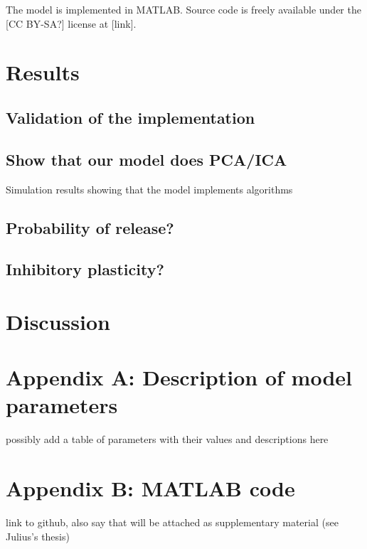 \documentclass[a4paper,12pt]{report}
\theoremstyle{definition}
\begin{document}
The model is implemented in MATLAB. Source code is freely available under the [CC BY-SA?] license at [link].


\chapter{Results}
\section{Validation of the implementation}

\section{Show that our model does PCA/ICA}
Simulation results showing that the model implements algorithms

\section{Probability of release?}

\section{Inhibitory plasticity?}


\chapter{Discussion}



\chapter*{Appendix A: Description of model parameters}

possibly add a table of parameters with their values and descriptions here

\chapter*{Appendix B: MATLAB code}

link to github, also say that will be attached as supplementary material (see Julius's thesis)


\end{document}
